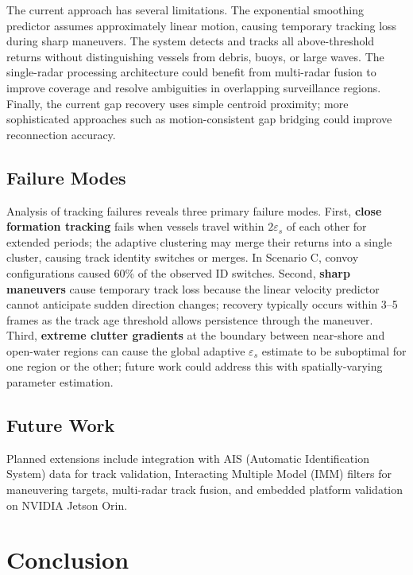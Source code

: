 \documentclass[conf]{new-aiaa}
\begin{document}
The current approach has several limitations. The exponential smoothing predictor assumes approximately linear motion, causing temporary tracking loss during sharp maneuvers. The system detects and tracks all above-threshold returns without distinguishing vessels from debris, buoys, or large waves. The single-radar processing architecture could benefit from multi-radar fusion to improve coverage and resolve ambiguities in overlapping surveillance regions. Finally, the current gap recovery uses simple centroid proximity; more sophisticated approaches such as motion-consistent gap bridging could improve reconnection accuracy.

\subsection{Failure Modes}

Analysis of tracking failures reveals three primary failure modes. First, \textbf{close formation tracking} fails when vessels travel within $2\varepsilon_s$ of each other for extended periods; the adaptive clustering may merge their returns into a single cluster, causing track identity switches or merges. In Scenario C, convoy configurations caused 60\% of the observed ID switches. Second, \textbf{sharp maneuvers} cause temporary track loss because the linear velocity predictor cannot anticipate sudden direction changes; recovery typically occurs within 3--5 frames as the track age threshold allows persistence through the maneuver. Third, \textbf{extreme clutter gradients} at the boundary between near-shore and open-water regions can cause the global adaptive $\varepsilon_s$ estimate to be suboptimal for one region or the other; future work could address this with spatially-varying parameter estimation.

\subsection{Future Work}

Planned extensions include integration with AIS (Automatic Identification System) data for track validation, Interacting Multiple Model (IMM) filters for maneuvering targets, multi-radar track fusion, and embedded platform validation on NVIDIA Jetson Orin.

\section{Conclusion}
\end{document}
